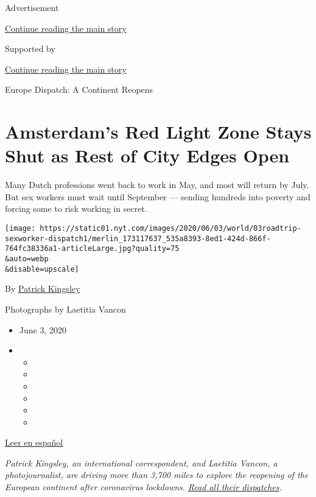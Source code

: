 Advertisement

\protect\hyperlink{after-top}{Continue reading the main story}

Supported by

\protect\hyperlink{after-sponsor}{Continue reading the main story}

Europe Dispatch: A Continent Reopens

\hypertarget{amsterdams-red-light-zone-stays-shut-as-rest-of-city-edges-open}{%
\section{Amsterdam's Red Light Zone Stays Shut as Rest of City Edges
Open}\label{amsterdams-red-light-zone-stays-shut-as-rest-of-city-edges-open}}

Many Dutch professions went back to work in May, and most will return by
July. But sex workers must wait until September --- sending hundreds
into poverty and forcing some to risk working in secret.

\texttt{[image: https://static01.nyt.com/images/2020/06/03/world/03roadtrip-sexworker-dispatch1/merlin\_173117637\_535a8393-8ed1-424d-866f-764fc38336a1-articleLarge.jpg?quality=75\\\&auto=webp\\\&disable=upscale]}

By \href{https://www.nytimes.com/by/patrick-kingsley}{Patrick Kingsley}

Photographs by Laetitia Vancon

\begin{itemize}
\item
  June 3, 2020
\item
  \begin{itemize}
  \item
  \item
  \item
  \item
  \item
  \item
  \end{itemize}
\end{itemize}

\href{https://www.nytimes.com/es/2020/06/05/espanol/mundo/amsterdam-zona-roja-coronavirus.html}{Leer
en español}

\emph{Patrick Kingsley, an international correspondent, and Laetitia
Vancon, a photojournalist, are driving more than 3,700 miles to explore
the reopening of the European continent after coronavirus lockdowns.}
\href{https://www.nytimes.com/2020/05/29/world/europe/a-continent-reopens.html}{\emph{Read
all their dispatches}}\emph{.}

